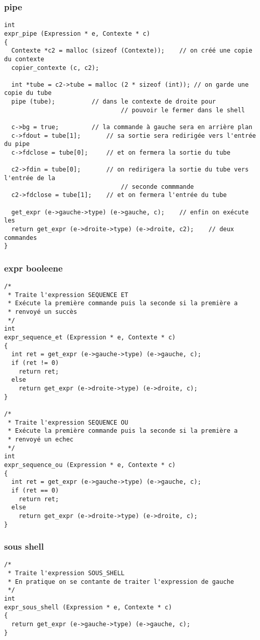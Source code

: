 \documentclass[12pt]{article}
\begin{document}
\subsubsection*{pipe}
\label{pipe}
\begin{verbatim}
int
expr_pipe (Expression * e, Contexte * c)
{
  Contexte *c2 = malloc (sizeof (Contexte));	// on créé une copie du contexte
  copier_contexte (c, c2);

  int *tube = c2->tube = malloc (2 * sizeof (int));	// on garde une copie du tube
  pipe (tube);			// dans le contexte de droite pour
                                // pouvoir le fermer dans le shell

  c->bg = true;			// la commande à gauche sera en arrière plan
  c->fdout = tube[1];		// sa sortie sera redirigée vers l'entrée du pipe
  c->fdclose = tube[0];		// et on fermera la sortie du tube

  c2->fdin = tube[0];		// on redirigera la sortie du tube vers l'entrée de la
                                // seconde commmande
  c2->fdclose = tube[1];	// et on fermera l'entrée du tube

  get_expr (e->gauche->type) (e->gauche, c);	// enfin on exécute les
  return get_expr (e->droite->type) (e->droite, c2);	// deux commandes
}

\end{verbatim}
\subsubsection*{expr booleene}
\label{et et ou}
\begin{verbatim}
/*
 * Traite l'expression SEQUENCE ET
 * Exécute la première commande puis la seconde si la première a
 * renvoyé un succès
 */
int
expr_sequence_et (Expression * e, Contexte * c)
{
  int ret = get_expr (e->gauche->type) (e->gauche, c);
  if (ret != 0)
    return ret;
  else
    return get_expr (e->droite->type) (e->droite, c);
}

/*
 * Traite l'expression SEQUENCE OU
 * Exécute la première commande puis la seconde si la première a
 * renvoyé un echec
 */
int
expr_sequence_ou (Expression * e, Contexte * c)
{
  int ret = get_expr (e->gauche->type) (e->gauche, c);
  if (ret == 0)
    return ret;
  else
    return get_expr (e->droite->type) (e->droite, c);
}
\end{verbatim}
\subsubsection*{sous shell}
\label{sousshell}
\begin{verbatim}
/*
 * Traite l'expression SOUS_SHELL
 * En pratique on se contante de traiter l'expression de gauche
 */
int
expr_sous_shell (Expression * e, Contexte * c)
{
  return get_expr (e->gauche->type) (e->gauche, c);
}
\end{verbatim}
\end{document}
